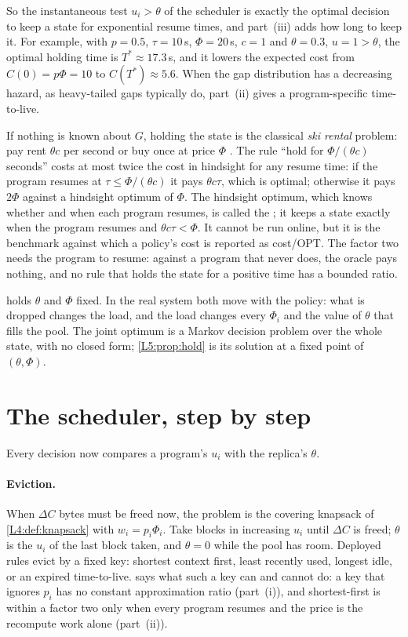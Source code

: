 So the instantaneous test $u_i>\theta$ of the scheduler is exactly the optimal decision
to keep a state for exponential resume times, and part~(iii) adds how long to keep it.
For example, with $p=0.5$, $\tau=10$\,s, $\Phi=20$\,s, $c=1$ and $\theta=0.3$, $u=1>\theta$,
the optimal holding time is $T^*\approx17.3$\,s, and it lowers the expected cost from
$C(0)=p\Phi=10$ to $C(T^*)\approx5.6$. When the gap distribution has a decreasing hazard, as
heavy-tailed gaps typically do, part~(ii) gives a program-specific time-to-live.

\begin{remark}\label{L5:rem:ski}
If nothing is known about $G$, holding the state is the classical \emph{ski rental}
problem: pay rent $\theta c$ per second or buy once at price $\Phi$
\cite{karlin1988}. The rule ``hold for $\Phi/(\theta c)$ seconds'' costs at most twice
the cost in hindsight for any resume time: if the program resumes at
$\tau\le\Phi/(\theta c)$ it pays $\theta c\tau$, which is optimal; otherwise it pays
$2\Phi$ against a hindsight optimum of $\Phi$. The hindsight optimum, which knows
whether and when each program resumes, is called the ; it keeps a state
exactly when the program resumes and $\theta c\tau<\Phi$. It cannot be run online, but
it is the benchmark against which a policy's cost is reported as cost/OPT. The factor
two needs the program to resume: against a program that never does, the oracle pays
nothing, and no rule that holds the state for a positive time has a bounded ratio.
\end{remark}

 holds $\theta$ and $\Phi$ fixed. In the real system both move with
the policy: what is dropped changes the load, and the load changes every $\Phi_i$ and
the value of $\theta$ that fills the pool. The joint optimum is a Markov decision problem
over the whole state, with no closed form; \cref{L5:prop:hold} is its solution at a
fixed point of $(\theta,\Phi)$.

\section{The scheduler, step by step}\label{L5:sec:scheduler}

Every decision now compares a program's $u_i$ with the replica's $\theta$.

\paragraph{Eviction.} When $\Delta C$ bytes must be freed now, the problem
is the covering knapsack of \cref{L4:def:knapsack} with $w_i=p_i\Phi_i$.
Take blocks in increasing $u_i$ until $\Delta C$ is freed; $\theta$ is the
$u_i$ of the last block taken, and $\theta=0$ while the pool has room.
Deployed rules evict by a fixed key: shortest context first, least recently
used, longest idle, or an expired time-to-live.  says what
such a key can and cannot do: a key that ignores $p_i$ has no constant
approximation ratio (part~(i)), and shortest-first is within a factor two
only when every program resumes and the price is the recompute work alone
(part~(ii)).


